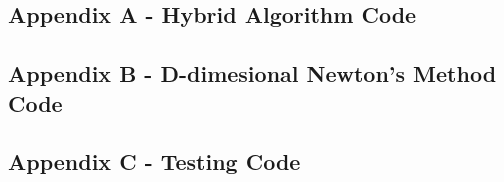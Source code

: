 \documentclass[10pt]{article}
\begin{document}
\pagebreak

\subsection*{Appendix A - Hybrid Algorithm Code}


\pagebreak

\subsection*{Appendix B - D-dimesional Newton's Method Code}


\pagebreak

\subsection*{Appendix C - Testing Code}

\end{document}
